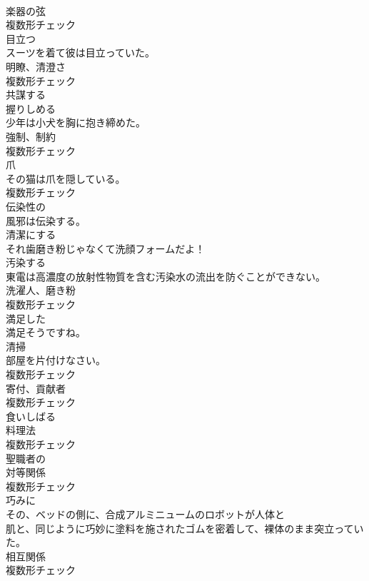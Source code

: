 \documentclass[8pt]{extreport}
\begin{document}
\begin{CJK}{UTF8}{min}
\\	[名詞]	楽器の弦	
\\	複数形チェック
\\	[形容詞]	目立つ	
\\	スーツを着て彼は目立っていた。	
\\	[名詞]	明瞭、清澄さ	
\\	複数形チェック
\\	[動詞]	共謀する	
\\	[動詞]	握りしめる	
\\	少年は小犬を胸に抱き締めた。	
\\	[名詞]	強制、制約	
\\	複数形チェック
\\	[名詞]	爪	
\\	その猫は爪を隠している。	
\\	複数形チェック
\\	[形容詞]	伝染性の	
\\	風邪は伝染する。	
\\	[動詞]	清潔にする	
\\	それ歯磨き粉じゃなくて洗顔フォームだよ！	
\\	[動詞]	汚染する	
\\	東電は高濃度の放射性物質を含む汚染水の流出を防ぐことができない。	
\\	[名詞]	洗濯人、磨き粉	
\\	複数形チェック
\\	[形容詞]	満足した	
\\	満足そうですね。	
\\	[名詞]	清掃	
\\	部屋を片付けなさい。	
\\	複数形チェック
\\	[名詞]	寄付、貢献者	
\\	複数形チェック
\\	[動詞]	食いしばる	
\\	[名詞]	料理法	
\\	複数形チェック
\\	[形容詞]	聖職者の	
\\	[名詞]	対等関係	
\\	複数形チェック
\\	[副詞]	巧みに	
\\	その、ベッドの側に、合成アルミニュームのロボットが人体と
\\	肌と、同じように巧妙に塗料を施されたゴムを密着して、裸体のまま突立っていた。	
\\	[名詞]	相互関係	
\\	複数形チェック

\end{CJK}
\end{document}
